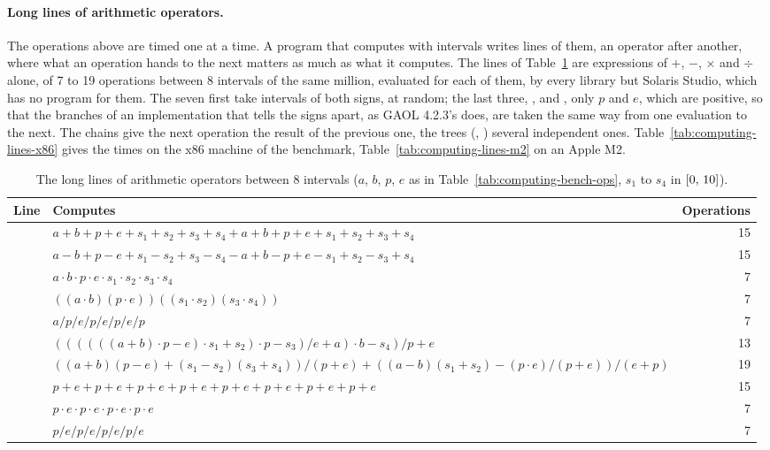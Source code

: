 \paragraph{Long lines of arithmetic operators.}
The operations above are timed one at a time. A program that computes with
intervals writes lines of them, an operator after another, where what an
operation hands to the next matters as much as what it computes. The lines
of Table~\ref{tab:computing-lines} are expressions of $+$, $-$, $\times$
and $\div$ alone, of 7 to 19 operations between 8 intervals of the same
million, evaluated for each of them, by every library but Solaris Studio,
which has no program for them. The seven first take intervals of both
signs, at random; the last three, ,  and
, only $p$ and $e$, which are positive, so that the
branches of an implementation that tells the signs apart, as GAOL 4.2.3's
does, are taken the same way from one evaluation to the next. The chains
give the next operation the result of the previous one, the trees
(, ) several independent ones.
Table~\ref{tab:computing-lines-x86} gives the times on the x86 machine of
the benchmark, Table~\ref{tab:computing-lines-m2} on an Apple M2.

\begin{table}[htbp]
\centering\footnotesize
\caption[The long lines of arithmetic operators between 8 intervals]{The long lines of arithmetic operators between 8 intervals ($a$, $b$, $p$, $e$ as in Table~\ref{tab:computing-bench-ops}, $s_1$ to $s_4$ in $\itv{0}{10}$).} \label{tab:computing-lines}
\begin{tabular}{|l|L{9.0cm}|r|}
\hline
\textbf{Line} & \textbf{Computes} & \textbf{Operations} \\
\hline
{} & $a + b + p + e + s_1 + s_2 + s_3 + s_4 + a + b + p + e + s_1
+ s_2 + s_3 + s_4$ & 15 \\
 & $a - b + p - e + s_1 - s_2 + s_3 - s_4 - a + b - p + e - s_1
+ s_2 - s_3 + s_4$ & 15 \\
 & $a \cdot b \cdot p \cdot e \cdot s_1 \cdot s_2 \cdot s_3 \cdot
s_4$ & 7 \\
 & $((a \cdot b)(p \cdot e))((s_1 \cdot s_2)(s_3 \cdot
s_4))$ & 7 \\
 & $a / p / e / p / e / p / e / p$ & 7 \\
 & $((((((a + b) \cdot p - e) \cdot s_1 + s_2) \cdot p - s_3) /
e + a) \cdot b - s_4) / p + e$ & 13 \\
 & $((a + b)(p - e) + (s_1 - s_2)(s_3 + s_4)) / (p + e) +
((a - b)(s_1 + s_2) - (p \cdot e) / (p + e)) / (e + p)$ & 19 \\
 & $p + e + p + e + p + e + p + e + p + e + p + e + p + e
+ p + e$ & 15 \\
 & $p \cdot e \cdot p \cdot e \cdot p \cdot e \cdot p \cdot
e$ & 7 \\
 & $p / e / p / e / p / e / p / e$ & 7 \\
\hline
\end{tabular}

\end{table}

